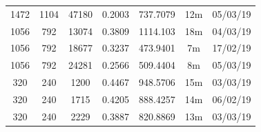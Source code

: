 \documentclass[11pt,a4paper]{report}
\begin{document}
\begin{itemize}
\begin{center}
\begin{tabular}{ c c c | c | c c c }
  1472 & 1104 & 47180 & 0.2003 & 737.7079 & 12m & 05/03/19 \\
  1056 & 792 & 13074 & 0.3809 & 1114.103 & 18m & 04/03/19 \\
  1056 & 792 & 18677 & 0.3237 & 473.9401 & 7m & 17/02/19 \\
  1056 & 792 & 24281 & 0.2566 & 509.4404 & 8m & 05/03/19 \\
  320 & 240 & 1200 & 0.4467 & 948.5706 & 15m & 03/03/19 \\
  320 & 240 & 1715 & 0.4205 & 888.4257 & 14m & 06/02/19 \\
  320 & 240 & 2229 & 0.3887 & 820.8869 & 13m & 03/03/19 \\
  \end{tabular}
  \end{center}
\end{itemize}
\end{document}
